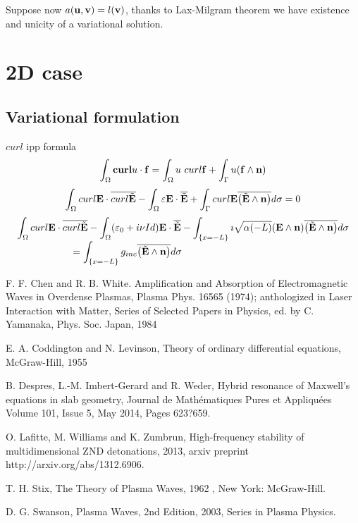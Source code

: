 \documentclass{article}
\newcommand{\be}{\begin{equation}}
\newcommand{\ee}{\end{equation}}
\newcommand{\E}{{\bf E}}
\newcommand{\n}{{\bf n}}
\newcommand{\f}{{\bf f}}
\newcommand{\ubf}{{\bf u}}
\newcommand{\vbf}{{\bf v}}
\newcommand{\curl}{{\bf curl}}
\newcommand{\eps}{{\bf \varepsilon}}
\begin{document}
Suppose now $a(\ubf,\vbf) = l(\vbf)$, thanks to Lax-Milgram theorem we have existence and unicity of a variational solution.
\section{2D case}


\subsection{Variational formulation}
$curl$ ipp formula
\be
\int_\Omega \curl u \cdot \f = \int_\Omega u\ curl \f + \int_\Gamma u (\f \wedge \n)
\ee
\be
\int_\Omega curl \E \cdot \overline{curl \tilde \E} - \int_\Omega \eps \E \cdot \overline{\tilde \E} + \int _\Gamma curl \E \overline{\left( \tilde \E\wedge \n \right)} d\sigma = 0
\ee
\be
\begin{array}{l}
\displaystyle \int_\Omega curl \E \cdot \overline{curl \tilde \E} - \int_\Omega (\eps_0+i\nu Id) \E \cdot \overline{\tilde \E} - \int _{\{x=-L\}} \imath \sqrt{\alpha(-L)}(\E\wedge \n) \overline{\left( \tilde \E\wedge \n \right)} d\sigma 
\\ \displaystyle \phantom{ fffffffff}= \int_{\{x=-L\}} g_{inc}  \overline{\left( \tilde \E\wedge \n \right)} d\sigma
\end{array}\ee


\begin{thebibliography}{99}


F. F. Chen and R. B. White.
Amplification and Absorption of 
Electromagnetic Waves in Overdense Plasmas, Plasma Phys. 16565
 (1974); anthologized in Laser Interaction with Matter, 
Series of Selected Papers in Physics, ed. by C. Yamanaka,  Phys. Soc. Japan, 1984



 E. A. Coddington and N. Levinson,
Theory of ordinary differential equations, 
McGraw-Hill, 1955 


 B. Despres, L.-M. Imbert-Gerard and R. Weder, 
Hybrid resonance of Maxwell's equations in slab geometry, 
Journal de Mathématiques Pures et Appliquées
Volume 101, Issue 5, May 2014, Pages 623?659.



 O. Lafitte, M. Williams and K. Zumbrun,
High-frequency stability of multidimensional ZND detonations, 2013,
arxiv preprint http://arxiv.org/abs/1312.6906.


 T. H. Stix,
The Theory of Plasma Waves, 1962 , New York: McGraw-Hill. 

 D.  G. Swanson,
Plasma Waves, 2nd Edition, 2003,
Series in Plasma Physics.



\end{thebibliography}
\end{document}
